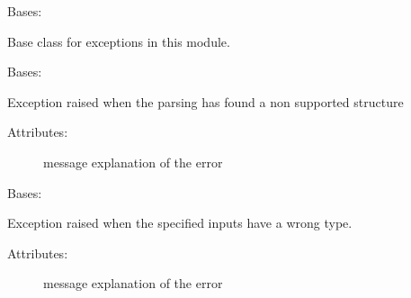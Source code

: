 
\begin{fulllineitems}
\label{\detokenize{eboa.engine:eboa.engine.errors.Error}}
Bases: 

Base class for exceptions in this module.

\end{fulllineitems}


\begin{fulllineitems}
\label{\detokenize{eboa.engine:eboa.engine.errors.ErrorParsingDictionary}}
Bases: {\hyperref[\detokenize{eboa.engine:eboa.engine.errors.Error}]{}}

Exception raised when the parsing has found a non supported structure
\begin{description}
\item[{Attributes:}] \leavevmode
message \textendash{} explanation of the error

\end{description}

\end{fulllineitems}


\begin{fulllineitems}
\label{\detokenize{eboa.engine:eboa.engine.errors.InputError}}
Bases: {\hyperref[\detokenize{eboa.engine:eboa.engine.errors.Error}]{}}

Exception raised when the specified inputs have a wrong type.
\begin{description}
\item[{Attributes:}] \leavevmode
message \textendash{} explanation of the error

\end{description}

\end{fulllineitems}

